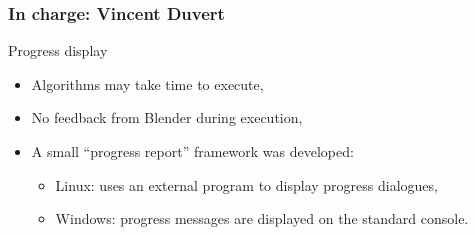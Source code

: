 \documentclass{beamer}
\begin{document}
\begin{frame}
	\frametitle{In charge: Vincent Duvert}
    \begin{block}{Progress display}
	\begin{itemize}
	\item Algorithms may take time to execute,
	\item No feedback from Blender during execution,
	\item A small ``progress report'' framework was developed:
	\begin{itemize}
		\item Linux: uses an external program to display progress dialogues,
		\item Windows: progress messages are displayed on the standard console.
	\end{itemize}
	\end{itemize}
    \end{block}
\end{frame}
\end{document}
